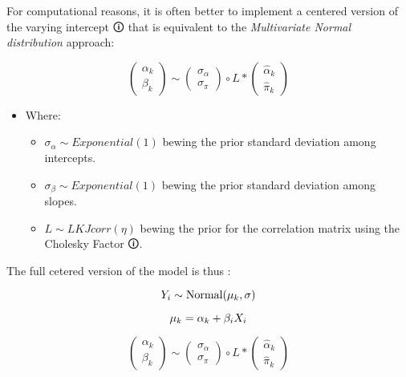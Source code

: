 \documentclass[
  letterpaper,
  DIV=11,
  numbers=noendperiod]{scrreprt}
\begin{document}
For computational reasons, it is often better to implement a
\label{centerRF}{{centered version of the varying
intercept 🛈}} that is equivalent to the \emph{Multivariate Normal
distribution} approach:

\[
\left(\begin{array}{cc} \alpha_k \\ \beta_k\end{array}\right)
 \sim 
\left(\begin{array}{cc} 
\sigma_\alpha\\
\sigma_\pi
\end{array}\right) \circ 
L *
\left(\begin{array}{cc} 
\widehat{\alpha}_k \\
\widehat{\pi}_k
\end{array}\right)
\]

\begin{itemize}
\item
  Where:

  \begin{itemize}
  \item
    \(\sigma_\alpha \sim Exponential(1)\) bewing the prior standard
    deviation among intercepts.
  \item
    \(\sigma_\beta \sim Exponential(1)\) bewing the prior standard
    deviation among slopes.
  \item
    \(L \sim LKJcorr(η)\) bewing the prior for the correlation matrix
    using the \label{chol}{{Cholesky Factor 🛈}}.
  \end{itemize}
\end{itemize}

The full cetered version of the model is thus :

\[
Y_{i} \sim \text{Normal}(\mu_k , \sigma) \\
\]

\[
\mu_k =   \alpha_k + \beta_i X_i \\
\]

\[
\left(\begin{array}{cc} \alpha_k \\ \beta_k\end{array}\right)
 \sim 
\left(\begin{array}{cc} 
\sigma_\alpha\\
\sigma_\pi
\end{array}\right) \circ 
L *
\left(\begin{array}{cc} 
\widehat{\alpha}_k \\
\widehat{\pi}_k
\end{array}\right)
\]
\end{document}

